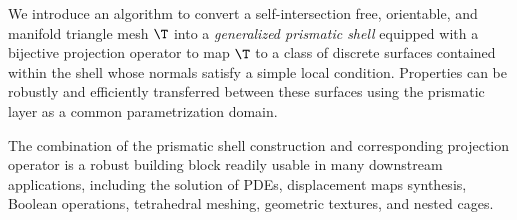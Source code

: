 We introduce an algorithm to convert a self-intersection free, orientable, and manifold triangle mesh $\T$ into a \emph{generalized prismatic shell} equipped with a bijective projection operator to map $\T$ to {a class of} discrete surfaces contained within the shell whose normals satisfy a simple local condition. Properties can be robustly and efficiently transferred between these surfaces using the prismatic layer as a common parametrization domain. %

The combination of the prismatic shell construction and corresponding projection operator is a robust building block readily usable in many downstream applications, including the solution of PDEs, displacement maps synthesis, Boolean operations, tetrahedral meshing, geometric textures, and nested cages.